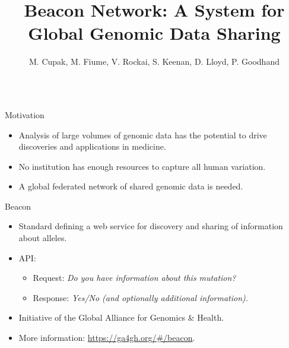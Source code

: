 \documentclass{beamer}
\title{\raisebox{\heightof{B)}-\height+7mm}{\texttt{[image: img/beacon-network-short.png]}}Beacon Network: A System for Global Genomic Data Sharing}
\author{M. Cupak, M. Fiume, V. Rockai, S. Keenan, D. Lloyd, P. Goodhand}
\begin{document}
\begin{frame}[fragile]

\begin{columns}[T]
\begin{column}{.46\textwidth}

\begin{block}{Motivation\hfill{}}
\begin{itemize}
\item Analysis of large volumes of genomic data has the potential to drive discoveries and applications in medicine.
\item No institution has enough resources to capture all human variation.
\item A global federated network of shared genomic data is needed.
\end{itemize}
\end{block}

\begin{block}{Beacon\hfill{}}
\begin{itemize}
\item Standard defining a \color{brandeisblue} web service \color{black} for \color{brandeisblue} discovery \color{black} and \color{brandeisblue} sharing \color{black} of information about alleles.
\item API:
	\begin{itemize}
	\item Request: \textit{Do you have information about this mutation?}
	\item Response: \textit{Yes/No (and optionally additional information).}
	\end{itemize}
\item Initiative of the Global Alliance for Genomics \& Health.
\item More information: \url{https://ga4gh.org/#/beacon}.
\end{itemize}
\end{block}


\end{column}
\end{columns}
\end{frame}
\end{document}
